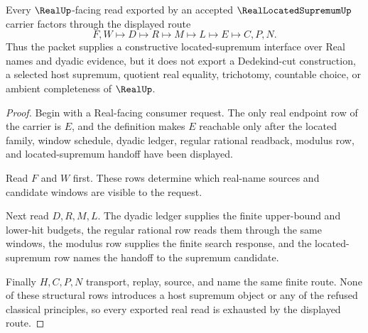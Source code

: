 \begin{theorem}
\label{thm:real-located-supremum-seal-route}
Every $\RealUp$-facing read exported by an accepted $\RealLocatedSupremumUp$ carrier factors through the displayed route
$$
F,W \longmapsto D \longmapsto R \longmapsto M \longmapsto L \longmapsto E \longmapsto C,P,N .
$$
Thus the packet supplies a constructive located-supremum interface over Real names and dyadic evidence, but it does not export a Dedekind-cut construction, a selected host supremum, quotient real equality, trichotomy, countable choice, or ambient completeness of $\RealUp$.
\end{theorem}
\begin{proof}
Begin with a Real-facing consumer request. The only real endpoint row of the carrier is $E$, and the definition makes $E$ reachable only after the located family, window schedule, dyadic ledger, regular rational readback, modulus row, and located-supremum handoff have been displayed.

Read $F$ and $W$ first. These rows determine which real-name sources and candidate windows are visible to the request.

Next read $D,R,M,L$. The dyadic ledger supplies the finite upper-bound and lower-hit budgets, the regular rational row reads them through the same windows, the modulus row supplies the finite search response, and the located-supremum row names the handoff to the supremum candidate.

Finally $H,C,P,N$ transport, replay, source, and name the same finite route. None of these structural rows introduces a host supremum object or any of the refused classical principles, so every exported real read is exhausted by the displayed route.
\end{proof}



